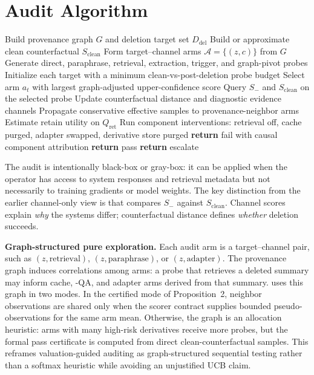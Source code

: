 \section{\method{} Audit Algorithm}

\begin{algorithm}[t]
\caption{\method{} graph-adaptive counterfactual audit}
\begin{algorithmic}[1]
\STATE Build provenance graph $G$ and deletion target set $D_{\mathrm{del}}$
\STATE Build or approximate clean counterfactual $S_{\mathrm{clean}}$
\STATE Form target--channel arms $\mathcal{A}=\{(z,c)\}$ from $G$
\STATE Generate direct, paraphrase, retrieval, extraction, trigger, and graph-pivot probes
\STATE Initialize each target with a minimum clean-vs-post-deletion probe budget
 \STATE Select arm $a_t$ with largest graph-adjusted upper-confidence score
 \STATE Query $S_-$ and $S_{\mathrm{clean}}$ on the selected probe
 \STATE Update counterfactual distance and diagnostic evidence channels
 \STATE Propagate conservative effective samples to provenance-neighbor arms
\ENDWHILE
\STATE Estimate retain utility on $Q_{\mathrm{ret}}$
\STATE Run component interventions: retrieval off, cache purged, adapter swapped, derivative store purged
 \STATE \textbf{return} fail with causal component attribution
 \STATE \textbf{return} pass
\ELSE
 \STATE \textbf{return} escalate
\ENDIF
\end{algorithmic}
\end{algorithm}

The audit is intentionally black-box or gray-box: it can be applied when the operator has access to system responses and retrieval metadata but not necessarily to training gradients or model weights. The key distinction from the earlier channel-only view is that \method{} compares $S_-$ against $S_{\mathrm{clean}}$. Channel scores explain \emph{why} the systems differ; counterfactual distance defines \emph{whether} deletion succeeds.

\textbf{Graph-structured pure exploration.}
Each audit arm is a target--channel pair, such as $(z,\mathrm{retrieval})$, $(z,\mathrm{paraphrase})$, or $(z,\mathrm{adapter})$. The provenance graph induces correlations among arms: a probe that retrieves a deleted summary may inform cache, -QA, and adapter arms derived from that summary. \method{} uses this graph in two modes. In the certified mode of Proposition~2, neighbor observations are shared only when the scorer contract supplies bounded pseudo-observations for the same arm mean. Otherwise, the graph is an allocation heuristic: arms with many high-risk derivatives receive more probes, but the formal pass certificate is computed from direct clean-counterfactual samples. This reframes valuation-guided auditing as graph-structured sequential testing rather than a softmax heuristic while avoiding an unjustified UCB claim.

